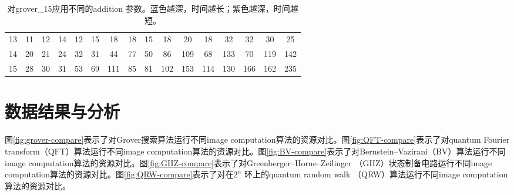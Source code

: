 \begin{table}[!htbp]
{\begin{tabular}{c|ccccccccccccccc}
        \rowcolor[HTML]{8DB4E2} 
        \cellcolor[HTML]{FFFFFF}13 & 11                                               & 12                          & 14                          & 12                          & 15                          & 18                                               & 18                         & 15                          & 18                          & 20                          & 18                          & 32                          & 32                          & 30                          & 25                          \\
        \rowcolor[HTML]{8DB4E2} 
        \cellcolor[HTML]{FFFFFF}14 & 20                                               & 21                          & 24                          & 32                          & 31                          & 44                                               & 77                         & 50                          & 86                          & \cellcolor[HTML]{538DD5}109 & 68                          & \cellcolor[HTML]{538DD5}133 & 70                          & \cellcolor[HTML]{538DD5}119 & \cellcolor[HTML]{538DD5}142 \\
        \rowcolor[HTML]{538DD5} 
        \cellcolor[HTML]{FFFFFF}15 & \cellcolor[HTML]{8DB4E2}28                       & \cellcolor[HTML]{8DB4E2}30  & \cellcolor[HTML]{8DB4E2}31  & \cellcolor[HTML]{8DB4E2}53  & \cellcolor[HTML]{8DB4E2}69  & 111                                              & \cellcolor[HTML]{8DB4E2}85 & \cellcolor[HTML]{8DB4E2}81  & 102                         & 153                         & 114                         & 130                         & 166                         & 162                         & 235                        
                         
        \end{tabular}
    }
    \caption{对grover\_15应用不同的addition 参数。蓝色越深，时间越长；紫色越深，时间越短。}%
    \label{table:addition}
\end{table}
  


\section{数据结果与分析}
图\ref{fig:grover-compare}表示了对Grover搜索算法运行不同image computation算法的资源对比。图\ref{fig:QFT-compare}表示了对quantum Fourier transform（QFT）算法运行不同image computation算法的资源对比。图\ref{fig:BV-compare}表示了对Bernstein–Vazirani（BV）算法运行不同image computation算法的资源对比。图\ref{fig:GHZ-compare}表示了对Greenberger–Horne–Zeilinger （GHZ）状态制备电路运行不同image computation算法的资源对比。图\ref{fig:QRW-compare}表示了对在$2^n$ 环上的quantum random walk （QRW）算法运行不同image computation算法的资源对比。

